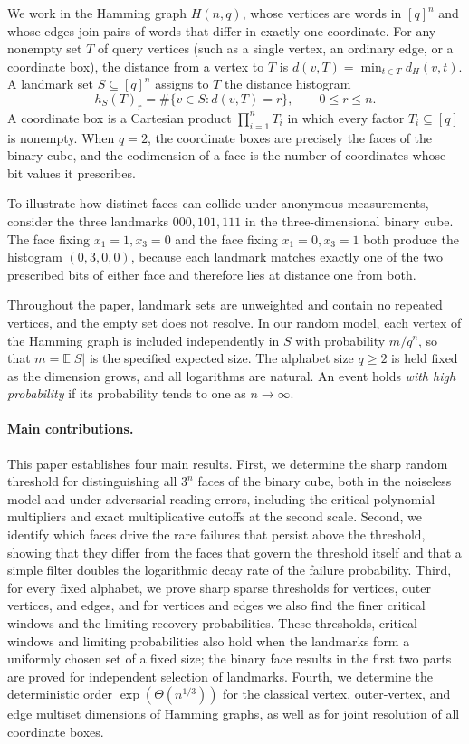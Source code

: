 \documentclass[11pt]{article}
\theoremstyle{definition}
\newcommand{\ex}{\mathbb E}
\begin{document}
We work in the Hamming graph \(H(n,q)\), whose vertices are words in \([q]^n\) and whose edges join pairs of words that differ in exactly one coordinate. For any nonempty set \(T\) of query vertices (such as a single vertex, an ordinary edge, or a coordinate box), the distance from a vertex to \(T\) is \(d(v,T)=\min_{t\in T}d_H(v,t)\). A landmark set \(S\subseteq[q]^n\) assigns to \(T\) the distance histogram
\[
h_S(T)_r=\#\{v\in S:d(v,T)=r\},\qquad 0\le r\le n.
\]
A coordinate box is a Cartesian product \(\prod_{i=1}^n T_i\) in which every factor \(T_i\subseteq[q]\) is nonempty. When \(q=2\), the coordinate boxes are precisely the faces of the binary cube, and the codimension of a face is the number of coordinates whose bit values it prescribes.

To illustrate how distinct faces can collide under anonymous measurements, consider the three landmarks \(000,101,111\) in the three-dimensional binary cube. The face fixing \(x_1=1,x_3=0\) and the face fixing \(x_1=0,x_3=1\) both produce the histogram \((0,3,0,0)\), because each landmark matches exactly one of the two prescribed bits of either face and therefore lies at distance one from both.

Throughout the paper, landmark sets are unweighted and contain no repeated vertices, and the empty set does not resolve. In our random model, each vertex of the Hamming graph is included independently in \(S\) with probability \(m/q^n\), so that \(m=\ex|S|\) is the specified expected size. The alphabet size \(q\ge2\) is held fixed as the dimension grows, and all logarithms are natural. An event holds \emph{with high probability} if its probability tends to one as \(n\to\infty\).

\paragraph{Main contributions.}
This paper establishes four main results. First, we determine the sharp random threshold for distinguishing all \(3^n\) faces of the binary cube, both in the noiseless model and under adversarial reading errors, including the critical polynomial multipliers and exact multiplicative cutoffs at the second scale. Second, we identify which faces drive the rare failures that persist above the threshold, showing that they differ from the faces that govern the threshold itself and that a simple filter doubles the logarithmic decay rate of the failure probability. Third, for every fixed alphabet, we prove sharp sparse thresholds for vertices, outer vertices, and edges, and for vertices and edges we also find the finer critical windows and the limiting recovery probabilities. These thresholds, critical windows and limiting probabilities also hold when the landmarks form a uniformly chosen set of a fixed size; the binary face results in the first two parts are proved for independent selection of landmarks. Fourth, we determine the deterministic order \(\exp(\Theta(n^{1/3}))\) for the classical vertex, outer-vertex, and edge multiset dimensions of Hamming graphs, as well as for joint resolution of all coordinate boxes.
\end{document}
